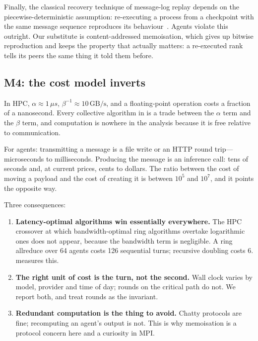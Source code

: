 Finally, the classical recovery technique of message-log replay depends on
the piecewise-deterministic assumption: re-executing a process from a
checkpoint with the same message sequence reproduces its
behaviour~\cite{Alvisi1995}. Agents violate this outright. Our substitute is
content-addressed memoisation, which gives up bitwise reproduction and keeps
the property that actually matters: a re-executed rank tells its peers the
same thing it told them before.

\subsection{M4: the cost model inverts}
\label{sec:m4}

In HPC, $\alpha \approx 1\,\mu s$, $\beta^{-1} \approx 10\,\mathrm{GB/s}$,
and a floating-point operation costs a fraction of a nanosecond. Every
collective algorithm in  is a trade between the
$\alpha$ term and the $\beta$ term, and computation is nowhere in the
analysis because it is free relative to communication.

For agents: transmitting a message is a file write or an HTTP round
trip---microseconds to milliseconds. Producing the message is an inference
call: tens of seconds and, at current prices, cents to dollars. The ratio
between the cost of moving a payload and the cost of creating it is between
$10^5$ and $10^7$, and it points the opposite way.

Three consequences:

\begin{enumerate}
\item \textbf{Latency-optimal algorithms win essentially everywhere.} The
HPC crossover at which bandwidth-optimal ring algorithms overtake
logarithmic ones does not appear, because the bandwidth term is negligible.
A ring allreduce over 64 agents costs 126 sequential turns; recursive
doubling costs 6.  measures this.
\item \textbf{The right unit of cost is the turn, not the second.} Wall
clock varies by model, provider and time of day; rounds on the critical path
do not. We report both, and treat rounds as the invariant.
\item \textbf{Redundant computation is the thing to avoid.} Chatty protocols
are fine; recomputing an agent's output is not. This is why memoisation is a
protocol concern here and a curiosity in MPI.
\end{enumerate}

